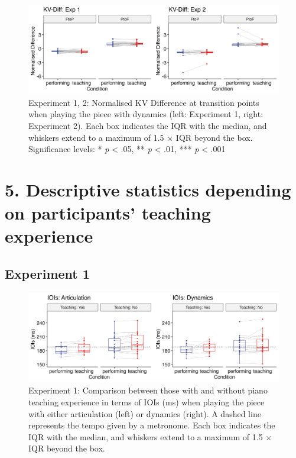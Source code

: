 \documentclass[
  man,floatsintext]{apa6}
\begin{document}
\begin{figure}
\includegraphics[width=1\linewidth]{manuscript_files/figure-latex/plot-vel-diff-2-1} \caption{\label{fig:vel-diff-2}Experiment 1, 2: Normalised KV Difference at transition points when playing the piece with dynamics (left: Experiment 1, right: Experiment 2). Each box indicates the IQR with the median, and whiskers extend to a maximum of 1.5 × IQR beyond the box. Significance levels: * \textit{p} < .05, ** \textit{p} < .01, *** \textit{p} < .001}\label{fig:plot-vel-diff-2}
\end{figure}

\clearpage

\hypertarget{descriptive-statistics-depending-on-participants-teaching-experience}{%
\section{5. Descriptive statistics depending on participants' teaching experience}\label{descriptive-statistics-depending-on-participants-teaching-experience}}

\hypertarget{experiment-1-5}{%
\subsection{Experiment 1}\label{experiment-1-5}}

\begin{figure}
\includegraphics[width=1\linewidth]{manuscript_files/figure-latex/plot-ioi-teaching-1-1} \caption{\label{fig:ioi-teaching-1}Experiment 1: Comparison between those with and without piano teaching experience in terms of IOIs (ms) when playing the piece with either articulation (left) or dynamics (right). A dashed line represents the tempo given by a metronome. Each box indicates the IQR with the median, and whiskers extend to a maximum of 1.5 × IQR beyond the box.}\label{fig:plot-ioi-teaching-1}
\end{figure}
\end{document}
